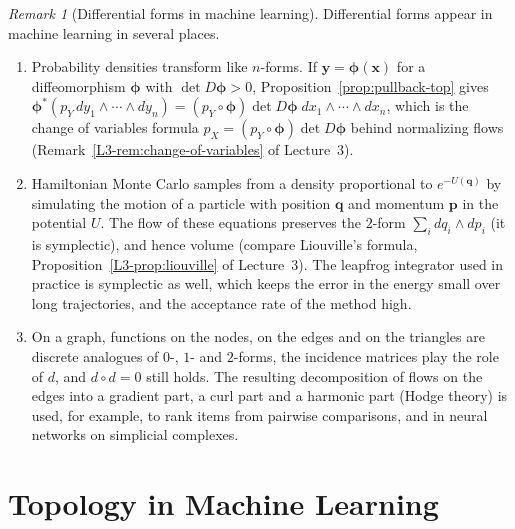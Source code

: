 \documentclass[11pt]{article}
\theoremstyle{definition}
\theoremstyle{plain}
\theoremstyle{remark}
\newtheorem{remark}[definition]{Remark}
\begin{document}
\begin{remark}[Differential forms in machine learning]
    Differential forms appear in machine learning in several places.
    \begin{enumerate}
        \item Probability densities transform like $n$-forms. If $\mathbf{y} = \boldsymbol{\phi}(\mathbf{x})$ for a diffeomorphism $\boldsymbol{\phi}$ with $\det D\boldsymbol{\phi} > 0$, Proposition~\ref{prop:pullback-top} gives $\boldsymbol{\phi}^*(p_Y\, dy_1 \wedge \cdots \wedge dy_n) = (p_Y \circ \boldsymbol{\phi}) \det D\boldsymbol{\phi}\; dx_1 \wedge \cdots \wedge dx_n$, which is the change of variables formula $p_X = (p_Y \circ \boldsymbol{\phi}) \det D\boldsymbol{\phi}$ behind normalizing flows (Remark~\ref{L3-rem:change-of-variables} of Lecture~3).
        \item Hamiltonian Monte Carlo samples from a density proportional to $e^{-U(\mathbf{q})}$ by simulating the motion of a particle with position $\mathbf{q}$ and momentum $\mathbf{p}$ in the potential $U$. The flow of these equations preserves the $2$-form $\sum_i dq_i \wedge dp_i$ (it is symplectic), and hence volume (compare Liouville's formula, Proposition~\ref{L3-prop:liouville} of Lecture~3). The leapfrog integrator used in practice is symplectic as well, which keeps the error in the energy small over long trajectories, and the acceptance rate of the method high.
        \item On a graph, functions on the nodes, on the edges and on the triangles are discrete analogues of $0$-, $1$- and $2$-forms, the incidence matrices play the role of $d$, and $d \circ d = 0$ still holds. The resulting decomposition of flows on the edges into a gradient part, a curl part and a harmonic part (Hodge theory) is used, for example, to rank items from pairwise comparisons, and in neural networks on simplicial complexes.
    \end{enumerate}
\end{remark}

\section{Topology in Machine Learning}\label{sec:ml}
\end{document}
